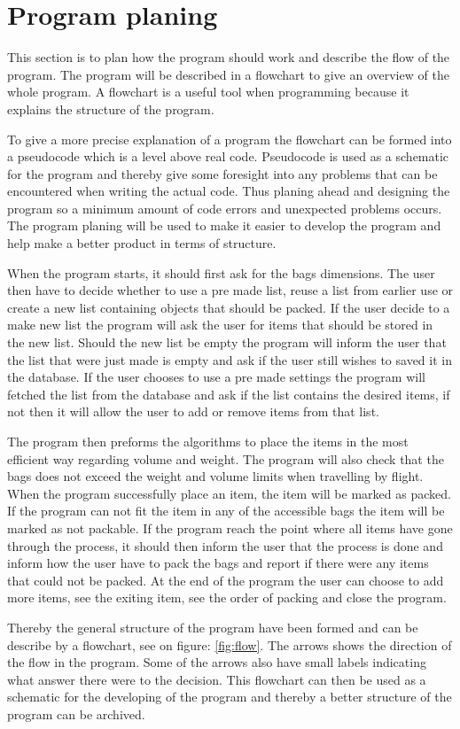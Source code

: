 \section{Program planing}
This section is to plan how the program should work and describe the flow of the program. The program will be described in a flowchart to give an overview of the whole program. A flowchart is a useful tool when programming because it explains the structure of the program.

To give a more precise explanation of a program the flowchart can be formed into a pseudocode which is a level above real code. Pseudocode is used as a schematic for the program and thereby give some foresight into any problems that can be encountered when writing the actual code. Thus planing ahead and designing the program so a minimum amount of code errors and unexpected problems occurs.
The program planing will be used to make it easier to develop the program and help make a better product in terms of structure.

When the program starts, it should first ask for the bags dimensions. The user then have to decide whether to use a pre made list, reuse a list from earlier use or create a new list containing objects that should be packed. If the user decide to a make new list the program will ask the user for items that should be stored in the new list. Should the new list be empty the program will inform the user that the list that were just made is empty and ask if the user still wishes to saved it in the database.
If the user chooses to use a pre made settings the program will fetched the list from the database and ask if the list contains the desired items, if not then it will allow the user to add or remove items from that list.

The program then preforms the algorithms to place the items in the most efficient way regarding volume and weight. The program will also check that the bags does not exceed the weight and volume limits when travelling by flight.
When the program successfully place an item, the item will be marked as packed. If the program can not fit the item in any of the accessible bags the item will be marked as not packable. If the program reach the point where all items have gone through the process, it should then inform the user that the process is done and inform how the user have to pack the bags and report if there were any items that could not be packed.
At the end of the program the user can choose to add more items, see the exiting item, see the order of packing and close the program.


Thereby the general structure of the program have been formed and can be describe by a flowchart, see on figure: \ref{fig:flow}.
The arrows shows the direction of the flow in the program. Some of the arrows also have small labels indicating what answer there were to the decision.
This flowchart can then be used as a schematic for the developing of the program and thereby a better structure of the program can be archived.